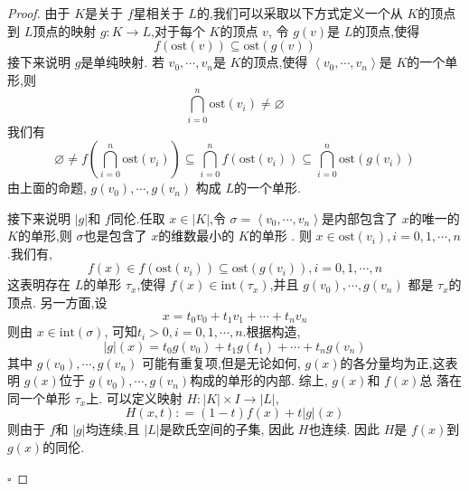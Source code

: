 \documentclass[../../几何与拓扑.tex]{subfiles}
\begin{document}
\begin{proof}
    由于 \(  K  \)是关于 \(  f  \)星相关于 \(  L  \)的,我们可以采取以下方式定义一个从 \(  K  \)的顶点到 \(  L  \)顶点的映射 \(  g: K\to L  \),对于每个 \(  K  \)的顶点 \(  v  \),
    令 \(  g\left( v \right)   \)是 \(  L  \)的顶点,使得 \[
    f\left( \mathrm{ost}\left( v \right)  \right)\subseteq  \mathrm{ost}\left( g\left( v \right)  \right)  
    \]     接下来说明 \(  g  \)是单纯映射. 若 \(   v_0,\cdots,v_{n}     \)是 \(  K  \)的顶点,使得 \(  \left< v_0,\cdots,v_{n}    \right>  \)是 \(  K  \)的一个单形,则 \[
    \bigcap_{i= 0}^{n}\mathrm{ost}\left( v_{i} \right)\neq \varnothing  
    \]我们有 \[
    \varnothing\neq  f\left( \bigcap_{i= 0}^{n} \mathrm{ost}\left( v_{i} \right)   \right)\subseteq \bigcap_{i= 0}^{n} f\left( \mathrm{ost}\left( v_{i} \right)  \right)\subseteq  \bigcap_{i= 0}^{n} \mathrm{ost}\left( g\left( v_{i}\right)  \right)     
    \] 由上面的命题, \(  g\left( v_0 \right),\cdots ,g\left( v_{n} \right)    \)    构成 \(  L  \)的一个单形. 

    接下来说明 \( \left| g \right|   \)和 \(  f  \)同伦.任取 \(  x \in \left| K \right|   \),令 \(   \sigma = \left< v_0,\cdots,v_{n}    \right>  \)是内部包含了 \(  x  \)的唯一的 \(  K  \)的单形,则 \(   \sigma   \)也是包含了 \(  x  \)的维数最小的 \(  K  \)的单形   .
    则 \(  x \in  \mathrm{ost}\left( v_{i} \right), i= 0, 1,\cdots,n    \).我们有, \[
        f\left( x \right) \in  f\left( \mathrm{ost}\left( v_{i} \right)  \right)\subseteq  \mathrm{ost}\left( g\left( v_{i} \right)  \right), i= 0, 1,\cdots,n   
         \] 这表明存在 \(  L  \)的单形 \(  \tau  _{x} \),使得 \(  f\left( x \right) \in  \mathrm{int}\left( \tau_{x}  \right)    \),并且 \(  g\left( v_0 \right),\cdots ,g\left( v_{n} \right)    \)     都是 \(  \tau_{x}   \)的顶点. 
         另一方面,设 \[
    x =  t_0v_0+ t_1v_1+ \cdots + t_{n}v_{n}
    \]则由 \(  x \in  \mathrm{int}\left(  \sigma  \right)   \), 可知\(  t_{i} >0, i= 0, 1,\cdots,n   \).根据构造, \[
    \left| g \right| \left( x \right) =  t_0g\left( v_0 \right)+ t_1g\left( t_1 \right)+ \cdots + t_{n}g\left( v_{n} \right)    
    \]其中 \(  g\left( v_0 \right),\cdots ,g\left( v_{n} \right)    \)   可能有重复项,但是无论如何, \(  g\left( x \right)   \)的各分量均为正,这表明 \(  g\left( x \right)   \)位于   \(  g\left( v_0 \right),\cdots ,g\left( v_{n} \right)    \)构成的单形的内部.
    综上, \(  g\left( x \right)   \)和 \(  f\left( x \right)   \)总 落在同一个单形 \(  \tau  _{x} \)上. 
    可以定义映射 \(  H: \left| K \right| \times I \to \left| L \right|    \), \[
    H\left( x,t \right): =   \left( 1-t \right)f\left( x \right)+   t \left| g \right|\left( x \right)  
    \] 则由于 \(  f  \)和 \(  \left| g \right|   \)均连续,且 \(  \left| L \right|   \)是欧氏空间的子集, 因此 \(  H  \)也连续.   因此 \(  H  \)是 \(  f\left( x \right)   \)到 \(  g\left( x \right)   \)的同伦.   
    
    \hfill $\square$
\end{proof}
\end{document}
